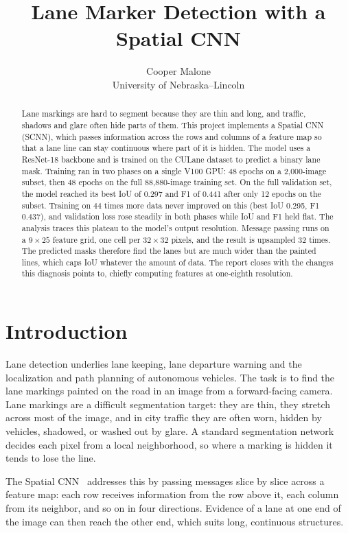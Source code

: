 \documentclass[11pt]{article}
\title{\textbf{Lane Marker Detection with a Spatial CNN}}
\author{Cooper Malone\\University of Nebraska--Lincoln}
\date{}
\begin{document}
\maketitle

\begin{abstract}
\noindent
Lane markings are hard to segment because they are thin and long, and traffic, shadows and glare
often hide parts of them. This project implements a Spatial CNN (SCNN), which passes information
across the rows and columns of a feature map so that a lane line can stay continuous where part of
it is hidden. The model uses a ResNet-18 backbone and is trained on the CULane dataset to predict a
binary lane mask. Training ran in two phases on a single V100 GPU: 48 epochs on a 2{,}000-image
subset, then 48 epochs on the full 88{,}880-image training set. On the full validation set, the
model reached its best IoU of 0.297 and F1 of 0.441 after only 12 epochs on the subset. Training on
44 times more data never improved on this (best IoU 0.295, F1 0.437), and validation loss rose
steadily in both phases while IoU and F1 held flat. The analysis traces this plateau to the model's
output resolution. Message passing runs on a $9\times25$ feature grid, one cell per $32\times32$
pixels, and the result is upsampled 32 times. The predicted masks therefore find the lanes but are
much wider than the painted lines, which caps IoU whatever the amount of data. The report closes with
the changes this diagnosis points to, chiefly computing features at one-eighth resolution.
\end{abstract}

\section{Introduction}

Lane detection underlies lane keeping, lane departure warning and the localization and path
planning of autonomous vehicles. The task is to find the lane markings painted on the road in an
image from a forward-facing camera. Lane markings are a difficult segmentation target: they are
thin, they stretch across most of the image, and in city traffic they are often worn, hidden by
vehicles, shadowed, or washed out by glare. A standard segmentation network decides each pixel from
a local neighborhood, so where a marking is hidden it tends to lose the line.

The Spatial CNN~\cite{pan2018} addresses this by passing messages slice by slice across a feature
map: each row receives information from the row above it, each column from its neighbor, and so on
in four directions. Evidence of a lane at one end of the image can then reach the other end, which
suits long, continuous structures.
\end{document}
